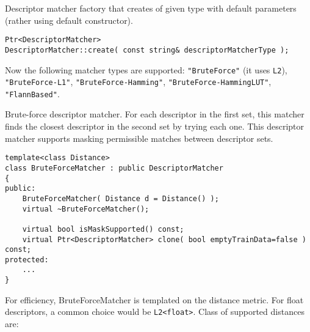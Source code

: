 Descriptor matcher factory that creates  of 
given type with default parameters (rather using default constructor).

\begin{lstlisting}
Ptr<DescriptorMatcher>
DescriptorMatcher::create( const string& descriptorMatcherType );
\end{lstlisting}

\begin{description}
\end{description}
Now the following matcher types are supported: \texttt{"BruteForce"} (it uses \texttt{L2}), \texttt{"BruteForce-L1"}, 
\texttt{"BruteForce-Hamming"}, \texttt{"BruteForce-HammingLUT"}, \texttt{"FlannBased"}.

Brute-force descriptor matcher. For each descriptor in the first set, this matcher finds the closest
descriptor in the second set by trying each one. This descriptor matcher supports masking 
permissible matches between descriptor sets.

\begin{lstlisting}
template<class Distance>
class BruteForceMatcher : public DescriptorMatcher
{
public:
    BruteForceMatcher( Distance d = Distance() );
    virtual ~BruteForceMatcher();

    virtual bool isMaskSupported() const;
    virtual Ptr<DescriptorMatcher> clone( bool emptyTrainData=false ) const;
protected:
    ...
}
\end{lstlisting}

For efficiency, BruteForceMatcher is templated on the distance metric.
For float descriptors, a common choice would be \texttt{L2<float>}. Class of supported distances are:

